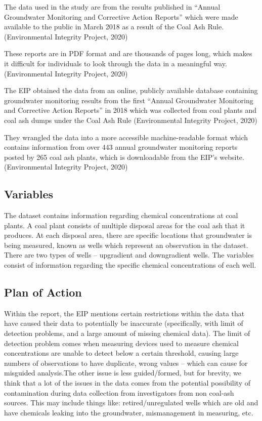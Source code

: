 \documentclass[12pt, twoside]{amherstthesis}
\begin{document}
The data used in the study are from the results published in ``Annual Groundwater Monitoring and Corrective Action Reports'' which were made available to the public in March 2018 as a result of the Coal Ash Rule. (Environmental Integrity Project, 2020)

These reports are in PDF format and are thousands of pages long, which makes it difficult for individuals to look through the data in a meaningful way. (Environmental Integrity Project, 2020)

The EIP obtained the data from an online, publicly available database containing groundwater monitoring results from the first ``Annual Groundwater Monitoring and Corrective Action Reports'' in 2018 which was collected from coal plants and coal ash dumps under the Coal Ash Rule (Environmental Integrity Project, 2020)

They wrangled the data into a more accessible machine-readable format which contains information from over 443 annual groundwater monitoring reports posted by 265 coal ash plants, which is downloadable from the EIP's website. (Environmental Integrity Project, 2020)

\newpage

\hypertarget{variables}{%
\subsection{Variables}\label{variables}}

The dataset contains information regarding chemical concentrations at coal plants. A coal plant consists of multiple disposal areas for the coal ash that it produces. At each disposal area, there are specific locations that groundwater is being measured, known as wells which represent an observation in the dataset. There are two types of wells -- upgradient and downgradient wells. The variables consist of information regarding the specific chemical concentrations of each well.

\hypertarget{plan-of-action}{%
\subsection{Plan of Action}\label{plan-of-action}}

Within the report, the EIP mentions certain restrictions within the data that have caused their data to potentially be inaccurate (specifically, with limit of detection problems, and a large amount of missing chemical data). The limit of detection problem comes when measuring devices used to measure chemical concentrations are unable to detect below a certain threshold, causing large numbers of observations to have duplicate, wrong values -- which can cause for misguided analysis.The other issue is less guided/formed, but for brevity, we think that a lot of the issues in the data comes from the potential possibility of contamination during data collection from investigators from non coal-ash sources. This may include things like: retired/unregulated wells which are old and have chemicals leaking into the groundwater, mismanagement in measuring, etc.
\end{document}
